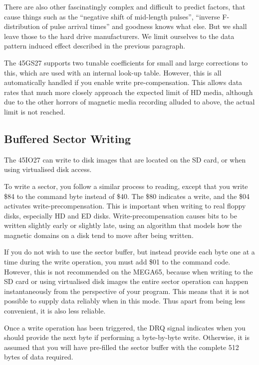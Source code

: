 \begin{enumerate}
There are also other fascinatingly complex and difficult to predict factors, that cause things such as the ``negative
shift of mid-length pulses'', ``inverse F-distribution of pulse arrival times'' and goodness knows what else.  But
we shall leave those to the hard drive manufacturers.  We limit ourselves to the data pattern induced effect described
in the previous paragraph.

The 45GS27 supports two tunable coefficients for small and large corrections to this,
which are used with an internal look-up table.  However, this is all automatically handled if you enable write pre-compensation.
This allows data rates that much more closely approach the expected limit of HD media, although due to the other horrors of
magnetic media recording alluded to above, the actual limit is not reached.

\subsection{Buffered Sector Writing}

The 45IO27 can write to disk images that are located on the SD card,
or when using virtualised disk access.

To write a sector, you follow a similar process to reading, except
that you write \$84 to the command byte instead of \$40.  The \$80
indicates a write, and the \$04 activates write-precompensation.  This
is important when writing to real floppy disks, especially HD and ED
disks.  Write-precompensation causes bits to be written slightly early
or slightly late, using an algorithm that models how the magnetic
domains on a disk tend to move after being written.

If you do not wish
to use the sector buffer, but instead provide each byte one at a time
during the write operation, you must add \$01 to the command code.
However, this is not recommended on the MEGA65, because when writing
to the SD card or using virtualised disk images the entire sector
operation can happen instantaneously from the perspective of your
program.  This means that it is not possible to supply data reliably
when in this mode.  Thus apart from being less convenient, it is also
less reliable. 

Once a write operation has been triggered, the DRQ signal indicates
when you should provide the next byte if performing a byte-by-byte
write. Otherwise, it is assumed that you will have pre-filled the
sector buffer with the complete 512 bytes of data required.


\end{enumerate}
